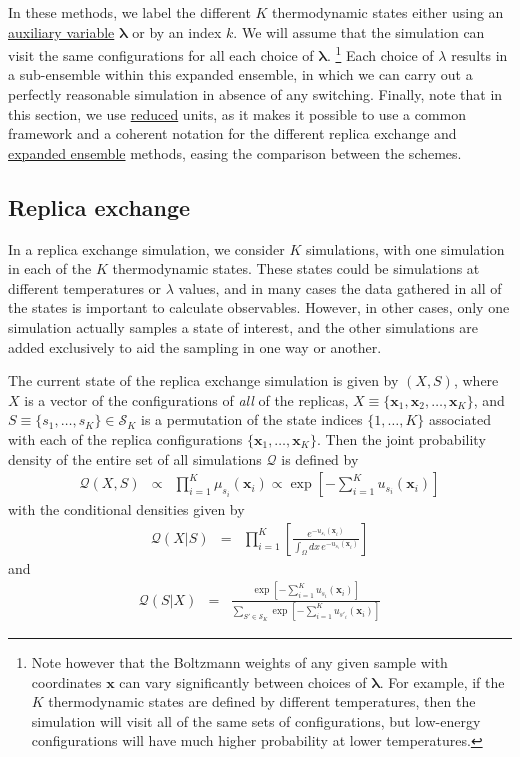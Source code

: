 \documentclass[9pt,review]{livecoms}
\newcommand{\vx}{\mathbf{x}}
\begin{document}
In these methods, we label the different $K$ thermodynamic states either using an \hyperlink{ref:AuxVar} {auxiliary variable} $\mathbf{\lambda}$  or by an index $k$. We will assume that the simulation can visit the same configurations for all each choice of $\mathbf{\lambda}$. \footnote{Note however that the Boltzmann weights of any given sample with coordinates $\vx$ can vary significantly between choices of $\mathbf{\lambda}$. For example, if the $K$ thermodynamic states are defined by different temperatures, then the simulation will visit all of the same sets of configurations, but low-energy configurations will have much higher probability at lower temperatures.} Each choice of $\lambda$ results in a sub-ensemble within this expanded ensemble, in which we can carry out a perfectly reasonable simulation in absence of any switching. Finally, note that in this section, we use \hyperlink{ref:reduced} {reduced} units, as it makes it possible to use a common framework and a coherent notation for the different replica exchange and \hyperlink{ref:ExpEns} {expanded ensemble} methods, easing the comparison between the schemes.

\subsection{Replica exchange} 
\label{sec:ReplicaExchange}
In a replica exchange simulation, we consider $K$ simulations, with one simulation in each of the $K$ thermodynamic states.  These states could be simulations at different temperatures or $\lambda$ values, and in many cases the data gathered in all of the states is important to calculate observables. However, in other cases, only one simulation actually samples a state of interest, and the other simulations are added exclusively to aid the sampling in one way or another.

The current state of the replica exchange simulation is given by $(X,S)$, where $X$ is a vector of the configurations of \emph{all} of the replicas, $X \equiv \{\vx_1, \vx_2, \ldots, \vx_K\}$, and $S \equiv\{s_1,\ldots,s_K\} \in \mathcal{S}_K$ is a permutation of the state indices $\{1, \ldots, K\}$ associated with each of the replica configurations $\{\vx_1, \ldots, \vx_K\}$. Then the joint probability density of the entire set of all simulations $\mathcal{Q}$ is defined by
\begin{eqnarray}
\mathcal{Q}(X, S) &\propto& \prod_{i=1}^{K} \mu_{s_i}(\vx_i) \propto \exp\left[-\sum_{i=1}^K u_{s_i}(\vx_i)\right]
\label{eq:parallereplica}
\end{eqnarray}
with the conditional densities given by
\begin{eqnarray}
\mathcal{Q}(X | S) &=& \prod_{i=1}^K \left[ \frac{e^{-u_{s_i}(\vx_i)}}{\int_\Omega dx \, e^{-u_{s_i}(\vx_i)}}\right]
\end{eqnarray}
and
\begin{eqnarray}
\mathcal{Q}(S | X) &=& \frac{\exp\left[- \sum\limits_{i=1}^K u_{s_i}(\vx_i) \right]}{\sum\limits_{S' \in \mathcal{S}_K} \exp\left[- \sum\limits_{i=1}^K u_{s'_i}(\vx_i) \right]}
\end{eqnarray}
\end{document}
